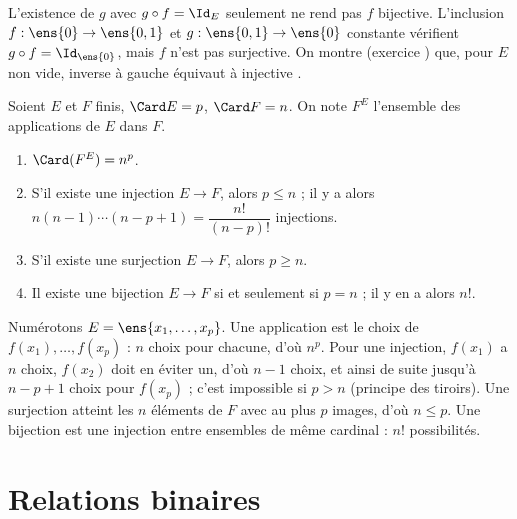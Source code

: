 \begin{attention}
L'existence de $g$ avec $g\circ f=\Id_E$ seulement ne rend pas $f$ bijective. L'inclusion $f:\ens{0}\to\ens{0,1}$ et $g:\ens{0,1}\to\ens{0}$ constante vérifient $g\circ f=\Id_{\ens{0}}$, mais $f$ n'est pas surjective. On montre (exercice ) que, pour $E$ non vide, \og inverse à gauche \fg{} équivaut à \og injective \fg.
\end{attention}
\begin{proposition}[Dénombrements]\label{prop-denombrement}
Soient $E$ et $F$ finis, $\Card E=p$, $\Card F=n$. On note $F^E$ l'ensemble des applications de $E$ dans $F$.
\begin{enumerate}
\item $\Card(F^E)=n^p$.
\item S'il existe une injection $E\to F$, alors $p\le n$ ; il y a alors $n(n-1)\cdots(n-p+1)=\dfrac{n!}{(n-p)!}$ injections.
\item S'il existe une surjection $E\to F$, alors $p\ge n$.
\item Il existe une bijection $E\to F$ si et seulement si $p=n$ ; il y en a alors $n!$.
\end{enumerate}
\end{proposition}
\begin{preuve}
Numérotons $E=\ens{x_1,\dots,x_p}$. Une application est le choix de $f(x_1),\dots,f(x_p)$ : $n$ choix pour chacune, d'où $n^p$. Pour une injection, $f(x_1)$ a $n$ choix, $f(x_2)$ doit en éviter un, d'où $n-1$ choix, et ainsi de suite jusqu'à $n-p+1$ choix pour $f(x_p)$ ; c'est impossible si $p>n$ (principe des tiroirs). Une surjection atteint les $n$ éléments de $F$ avec au plus $p$ images, d'où $n\le p$. Une bijection est une injection entre ensembles de même cardinal : $n!$ possibilités.
\end{preuve}

\section{Relations binaires}
